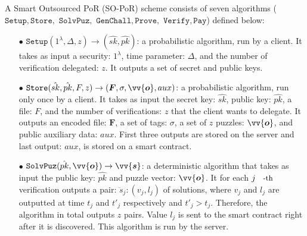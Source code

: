 \begin{definition}
A Smart Outsourced PoR (SO-PoR) scheme consists of seven algorithms ($\mathtt{Setup}, \mathtt{Store},$ $ \mathtt {SolvPuz}, $ $ \mathtt{GenChall}, \mathtt{Prove},$ $ \mathtt{Verify},  \mathtt{Pay}$) defined below: 



\begin{itemize}
\item[$\bullet$] $\mathtt{Setup}(1^{\scriptscriptstyle\lambda},\Delta, z)\rightarrow (\hat{sk},\hat{pk})$:  a probabilistic algorithm, run by a client.  It  takes as input a security: $1^{\scriptscriptstyle\lambda}$, time parameter: $\Delta$, and the number of verification delegated: $z$. It  outputs a set of  secret and public keys.



\item[$\bullet$] $\mathtt{Store}(\hat{sk},\hat{pk}, F,z)\rightarrow ({\bm{F}}, \sigma, \vv{\bm{o}},aux)$: a probabilistic algorithm, run only once by a client. It  takes as  input the secret key: $\hat{sk}$, public key: $\hat{pk}$, a file: $F$, and the number of verifications: $z$ that the client wants to delegate. It outputs an encoded file: ${\bm{F}}$,  a set of tags: $\sigma$, a set of $z$ puzzles: $\vv{\bm{o}}$, and public auxiliary data: $aux$. First three outputs are stored on the server and last output: $aux$, is   stored on a smart contract. 



\item[$\bullet$] $\mathtt {SolvPuz}(\hat{pk},\vv{\bm{o}})\rightarrow \vv{\bm{s}}$:  a deterministic algorithm that takes as input the public key: $\hat{pk}$ and puzzle vector: $\vv{\bm{o}}$.  It for each  $j\text{\small{-th}}$ verification outputs a  pair: $\ddot{s}_{\scriptscriptstyle j}:(v_{\scriptscriptstyle j},l_{\scriptscriptstyle j})$ of solutions, where $v_{\scriptscriptstyle j}$ and $l_{\scriptscriptstyle j}$ are outputted at time $t_{\scriptscriptstyle j}$ and $t'_{\scriptscriptstyle j}$ respectively and $t'_{\scriptscriptstyle j}> t_{\scriptscriptstyle j}$. Therefore, the algorithm in total outputs $z$ pairs. Value $l_{\scriptscriptstyle j}$ is sent  to the smart contract right after it is discovered. This algorithm is run  by the server.





\end{itemize}
\end{definition}
